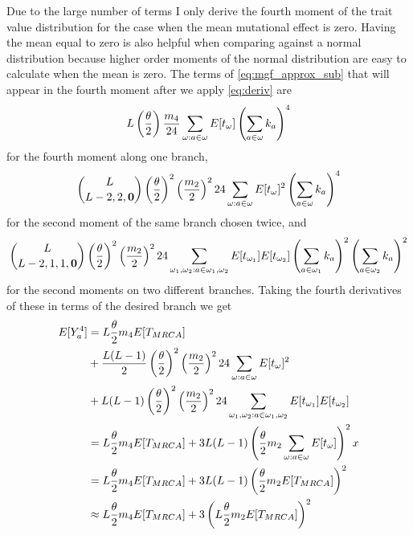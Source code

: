 Due to the large number of terms I only derive the fourth moment of the trait
value distribution for the case when the mean mutational effect is zero. Having
the mean equal to zero is also helpful when comparing against a normal
distribution because higher order moments of the normal distribution are easy to
calculate when the mean is zero. The terms of \eqref{eq:mgf_approx_sub} that
will appear in the fourth moment after we apply \eqref{eq:deriv} are
\begin{equation*}
  L \left(\frac{\theta}{2}\right) \frac{m_4}{24}
  \sum_{\omega:a\in \omega} E[t_\omega] \left(\sum_{a \in \omega} k_a\right)^4
\end{equation*}
for the fourth moment along one branch,
\begin{equation*}
  \binom{L}{L-2,2,\mathbf{0}}\left(\frac{\theta}{2}\right)^2\left(\frac{m_2}{2}\right)^2
  24 \sum_{\omega:a\in \omega} E[t_\omega]^2 \left(\sum_{a \in \omega} k_a\right)^4
\end{equation*}
for the second moment of the same branch chosen twice, and
\begin{equation*}
  \binom{L}{L-2,1,1,\mathbf{0}}\left(\frac{\theta}{2}\right)^2\left(\frac{m_2}{2}\right)^2
  24 \sum_{\omega_1 , \omega_2: a \in \omega_1 , \omega_2} E[t_{\omega_1}]E[t_{\omega_2}]
  \left(\sum_{a \in \omega_1} k_a\right)^2\left(\sum_{a \in \omega_2} k_a\right)^2
\end{equation*}
for the second moments on two different branches. Taking the fourth derivatives
of these in terms of the desired branch we get
\begin{align}
  \label{eq:mom4}
  E[Y_a^4] &= L\frac{\theta}{2} m_4 E[T_{MRCA}] \nonumber \\
  &+ \frac{L(L-1)}{2} \left(\frac{\theta}{2}\right)^2\left( \frac{m_2}{2} \right)^2
  24 \sum_{\omega:a\in \omega} E[t_\omega]^2 \nonumber \\
  &+ L(L-1) \left(\frac{\theta}{2}\right)^2\left( \frac{m_2}{2} \right)^2
  24 \sum_{\omega_1 , \omega_2: a \in \omega_1 , \omega_2} E[t_{\omega_1}]E[t_{\omega_2}] \nonumber \\
  &= L\frac{\theta}{2} m_4 E[T_{MRCA}] +
  3L(L-1)\left( \frac{\theta}{2} m_2 \sum_{\omega:a\in \omega} E[t_\omega] \right)^2x \nonumber \\
  &= L\frac{\theta}{2} m_4 E[T_{MRCA}] +
  3L(L-1)\left( \frac{\theta}{2} m_2 E[T_{MRCA}] \right)^2 \\
  &\approx L\frac{\theta}{2} m_4 E[T_{MRCA}] +
  3\left(L \frac{\theta}{2} m_2 E[T_{MRCA}] \right)^2 \nonumber 
\end{align}
